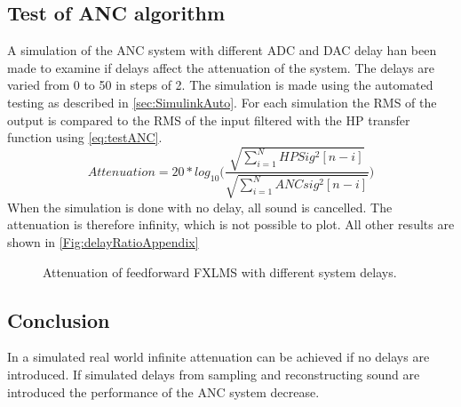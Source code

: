\subsection{Test of ANC algorithm}
A simulation of the ANC system with different ADC and DAC delay han been made to examine if delays affect the attenuation of the system. The delays are varied from 0 to 50 in steps of 2. The simulation is made using the automated testing as described in \autoref{sec:SimulinkAuto}. For each simulation the RMS of the output is compared to the RMS of the input filtered with the HP transfer function using \autoref{eq:testANC}.
\begin{equation}\label{eq:testANC}
		Attenuation=20*log_{10}\bigg(\frac{\sqrt{\sum\limits_{i=1}^{N}HPSig^2[n-i]}}{\sqrt{\sum\limits_{i=1}^{N}ANCsig^2[n-i]}}\bigg)
\end{equation}
When the simulation is done with no delay, all sound is cancelled. The attenuation is therefore infinity, which is not possible to plot. All other results are shown in \autoref{Fig:delayRatioAppendix}

\begin{figure}[H]
	\centering
	
	\caption{Attenuation of feedforward FXLMS with different system delays.}
	\label{Fig:delayRatioAppendix}
\end{figure}

\subsection{Conclusion}
In a simulated real world infinite attenuation can be achieved if no delays are introduced. If simulated delays from sampling and reconstructing sound are introduced the performance of the ANC system decrease.